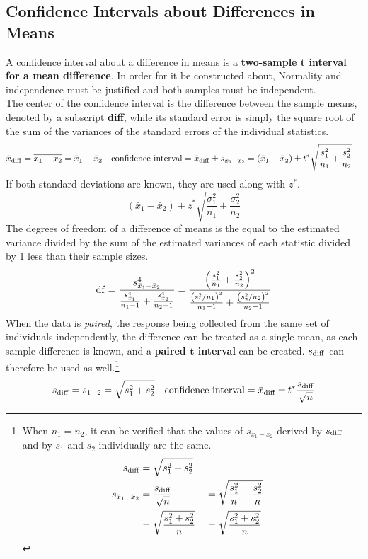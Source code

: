\documentclass[../AP_Statistics.tex]{subfiles}
\begin{document}
			\subsection*{Confidence Intervals about Differences in Means}
				A confidence interval about a difference in means is a \textbf{two-sample $\pmb{t}$ interval for a mean difference}. In order for it be constructed about, Normality and independence must be justified and both samples must be independent. \\
				The center of the confidence interval is the difference between the sample means, denoted by a subscript \textbf{diff}, while its standard error is simply the square root of the sum of the variances of the standard errors of the individual statistics.
				\begin{align*}
					\bar{x}_{\mathrm{diff}} &= \overline{x_1 - x_2} = \bar{x}_1 - \bar{x}_2 & 
					\text{confidence interval} &= \bar{x}_{\mathrm{diff}} \pm s_{\bar{x}_1 - \bar{x}_2} = (\bar{x}_1 - \bar{x}_2) \pm t^*\sqrt{\frac{s_1^2}{n_1} + \frac{s_2^2}{n_2}}
				\end{align*}
				If both standard deviations are known, they are used along with $z^*$.
				\[(\bar{x}_1 - \bar{x}_2) \pm z^*\sqrt{\frac{\sigma_1^2}{n_1} +\frac{\sigma_2^2}{n_2}}\]
				The degrees of freedom of a difference of means is the equal to the estimated variance divided by the sum of the estimated variances of each statistic divided by 1 less than their sample sizes.
				\[\operatorname{\mathrm{df}} = \frac{s_{\bar{x}_1 - \bar{x}_2}^4}{\frac{s_{\bar{x}_1}^4}{n_1 - 1} + \frac{s_{\bar{x}_2}^4}{n_2 - 1}} = \frac{\left(\frac{s_1^2}{n_1} + \frac{s_2^2}{n_2}\right)^2}{\frac{\left(s_1^2/n_1\right)^2}{n_1 - 1} + \frac{\left(s_2^2/n_2\right)^2}{n_2 - 1}}\]
				When the data is \emph{paired}, the response being collected from the same set of individuals independently, the difference can be treated as a single mean, as each sample difference is known, and a \textbf{paired $\pmb{t}$ interval} can be created. $s_{\mathrm{diff}}$ can therefore be used as well.\footnote{
					When $n_1 = n_2$, it can be verified that the values of $s_{\bar{x}_1 - \bar{x}_2}$ derived by $s_{\mathrm{diff}}$ and by $s_1$ and $s_2$ individually are the same.
					\begin{align*}
						s_{\mathrm{diff}} &= \sqrt{s_1^2 + s_2^2} \\
						s_{\bar{x}_1 - \bar{x}_2} &= \frac{s_{\mathrm{diff}}}{\sqrt{n}} & &= \sqrt{\frac{s_1^2}{n} + \frac{s_2^2}{n}} \\
							&= \sqrt{\frac{s_1^2 + s_2^2}{n}} & &= \sqrt{\frac{s_1^2 + s_2^2}{n}}\\
					\end{align*}
					}
				\begin{align*}
					s_{\mathrm{diff}} &= s_{1 - 2} = \sqrt{s_1^2 + s_2^2} &\text{confidence interval} = \bar{x}_{\mathrm{diff}} \pm t^*\frac{s_{\mathrm{diff}}}{\sqrt{n}}
				\end{align*}
\end{document}
